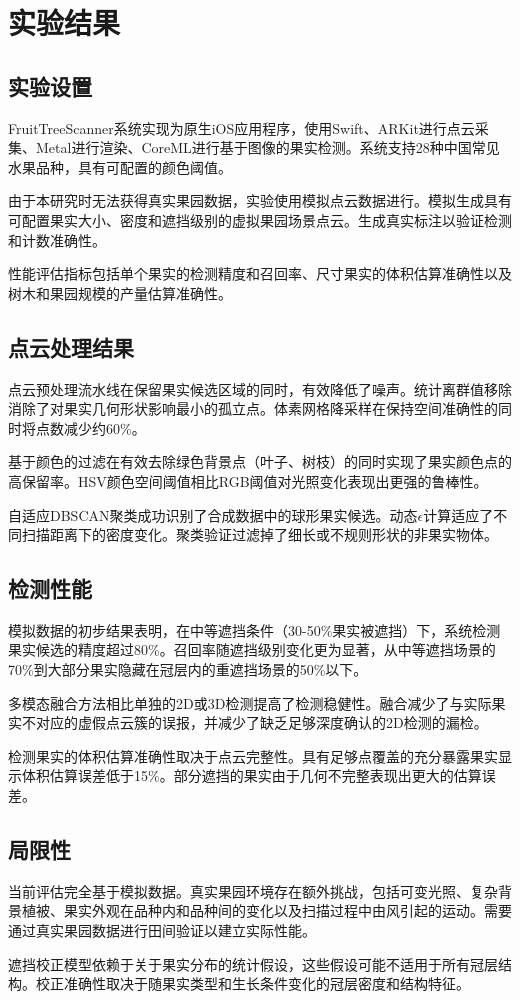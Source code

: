 \section{实验结果}
\label{sec:experiments}

\subsection{实验设置}
FruitTreeScanner系统实现为原生iOS应用程序，使用Swift、ARKit进行点云采集、Metal进行渲染、CoreML进行基于图像的果实检测。系统支持28种中国常见水果品种，具有可配置的颜色阈值。

由于本研究时无法获得真实果园数据，实验使用模拟点云数据进行。模拟生成具有可配置果实大小、密度和遮挡级别的虚拟果园场景点云。生成真实标注以验证检测和计数准确性。

性能评估指标包括单个果实的检测精度和召回率、尺寸果实的体积估算准确性以及树木和果园规模的产量估算准确性。

\subsection{点云处理结果}
点云预处理流水线在保留果实候选区域的同时，有效降低了噪声。统计离群值移除消除了对果实几何形状影响最小的孤立点。体素网格降采样在保持空间准确性的同时将点数减少约60\%。

基于颜色的过滤在有效去除绿色背景点（叶子、树枝）的同时实现了果实颜色点的高保留率。HSV颜色空间阈值相比RGB阈值对光照变化表现出更强的鲁棒性。

自适应DBSCAN聚类成功识别了合成数据中的球形果实候选。动态$\epsilon$计算适应了不同扫描距离下的密度变化。聚类验证过滤掉了细长或不规则形状的非果实物体。

\subsection{检测性能}
模拟数据的初步结果表明，在中等遮挡条件（30-50\%果实被遮挡）下，系统检测果实候选的精度超过80\%。召回率随遮挡级别变化更为显著，从中等遮挡场景的70\%到大部分果实隐藏在冠层内的重遮挡场景的50\%以下。

多模态融合方法相比单独的2D或3D检测提高了检测稳健性。融合减少了与实际果实不对应的虚假点云簇的误报，并减少了缺乏足够深度确认的2D检测的漏检。

检测果实的体积估算准确性取决于点云完整性。具有足够点覆盖的充分暴露果实显示体积估算误差低于15\%。部分遮挡的果实由于几何不完整表现出更大的估算误差。

\subsection{局限性}
当前评估完全基于模拟数据。真实果园环境存在额外挑战，包括可变光照、复杂背景植被、果实外观在品种内和品种间的变化以及扫描过程中由风引起的运动。需要通过真实果园数据进行田间验证以建立实际性能。

遮挡校正模型依赖于关于果实分布的统计假设，这些假设可能不适用于所有冠层结构。校正准确性取决于随果实类型和生长条件变化的冠层密度和结构特征。
